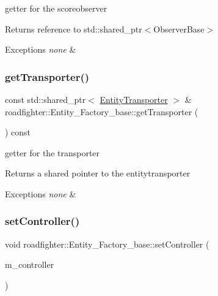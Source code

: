 getter for the scoreobserver \begin{DoxyReturn}{Returns}
reference to std\+::shared\+\_\+ptr$<$\+Observer\+Base$>$ 
\end{DoxyReturn}

\begin{DoxyExceptions}{Exceptions}
{\em none} & \\
\hline
\end{DoxyExceptions}
\mbox{\label{classroadfighter_1_1Entity__Factory__base_a4a8d467738722cfb4f343de72a4a355a}} 
\subsubsection{\texorpdfstring{get\+Transporter()}{getTransporter()}}
{\footnotesize\ttfamily const std\+::shared\+\_\+ptr$<$ \hyperlink{classroadfighter_1_1EntityTransporter}{Entity\+Transporter} $>$ \& roadfighter\+::\+Entity\+\_\+\+Factory\+\_\+base\+::get\+Transporter (\begin{DoxyParamCaption}{ }\end{DoxyParamCaption}) const}

getter for the transporter \begin{DoxyReturn}{Returns}
a shared pointer to the entitytransporter 
\end{DoxyReturn}

\begin{DoxyExceptions}{Exceptions}
{\em none} & \\
\hline
\end{DoxyExceptions}
\mbox{\label{classroadfighter_1_1Entity__Factory__base_a6c9363d763f34f39a44eaf02c6cb9f87}} 
\subsubsection{\texorpdfstring{set\+Controller()}{setController()}}
{\footnotesize\ttfamily void roadfighter\+::\+Entity\+\_\+\+Factory\+\_\+base\+::set\+Controller (\begin{DoxyParamCaption}\item[{const std\+::shared\+\_\+ptr$<$ \hyperlink{classroadfighter_1_1InputController}{Input\+Controller} $>$ \&}]{m\+\_\+controller }\end{DoxyParamCaption})}

